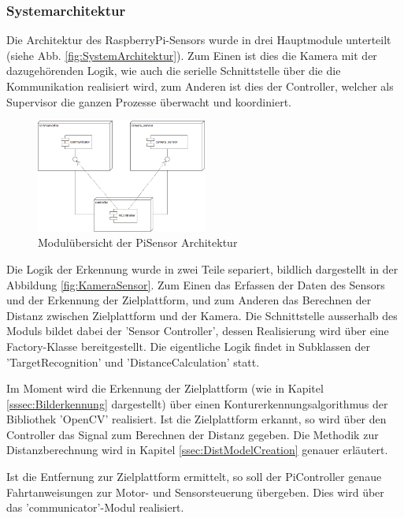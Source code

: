 \documentclass[a4paper]{report}
\begin{document}
\subsubsection{Systemarchitektur}
\label{sssec:SysArch}

Die Architektur des RaspberryPi-Sensors wurde in drei Hauptmodule unterteilt (siehe Abb. \ref{fig:SystemArchitektur}). Zum Einen ist dies die Kamera mit der dazugehörenden Logik, wie auch die serielle Schnittstelle über die die Kommunikation realisiert wird, zum Anderen ist dies der Controller, welcher als Supervisor die ganzen Prozesse überwacht und koordiniert.

\begin{figure}[h!]
	\centering
	\includegraphics[keepaspectratio,width=0.5\textwidth]{SystemArchitektur}
	\caption{Modulübersicht der PiSensor Architektur}
	\label{fig:PiSensorSystemArchitektur}
\end{figure}

Die Logik der Erkennung wurde in zwei Teile separiert, bildlich dargestellt in der Abbildung \ref{fig:KameraSensor}. Zum Einen das Erfassen der Daten des Sensors und der Erkennung der Zielplattform, und zum Anderen das Berechnen der Distanz zwischen Zielplattform und der Kamera. Die Schnittstelle ausserhalb des Moduls bildet dabei der 'Sensor Controller', dessen Realisierung wird über eine Factory-Klasse bereitgestellt. Die eigentliche Logik findet in Subklassen der 'TargetRecognition' und 'DistanceCalculation' statt.

Im Moment wird die Erkennung der Zielplattform (wie in Kapitel \ref{sssec:Bilderkennung} dargestellt) über einen Kontur\-erkennungs\-algorithmus der Bibliothek 'OpenCV' realisiert. Ist die Zielplattform erkannt, so wird über den Controller das Signal zum Berechnen der Distanz gegeben. Die Methodik zur Distanzberechnung wird in Kapitel \ref{ssec:DistModelCreation} genauer erläutert.

Ist die Entfernung zur Zielplattform ermittelt, so soll der PiController genaue Fahrtanweisungen zur Motor- und Sensorsteuerung übergeben. Dies wird über das 'communicator'-Modul realisiert.
\end{document}

